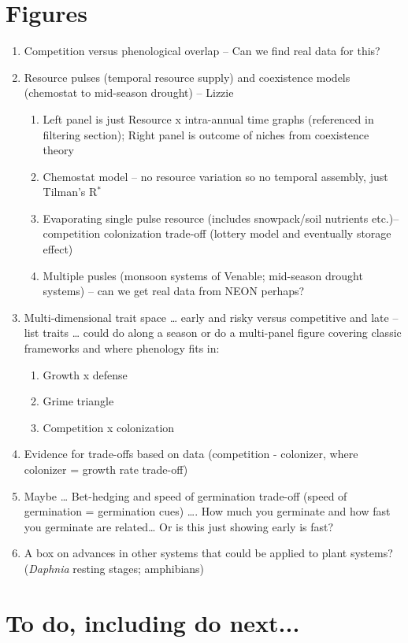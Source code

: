 \documentclass[11pt]{article}
\begin{document}
\section{Figures}
\begin{enumerate}
\item Competition versus phenological overlap -- Can we find real data for this?
\item Resource pulses (temporal resource supply) and coexistence models (chemostat to mid-season drought)  -- Lizzie
\begin{enumerate}
\item Left panel is just Resource x intra-annual time graphs (referenced in filtering section); Right panel is outcome of niches from coexistence theory 
\item Chemostat model – no resource variation so no temporal assembly, just Tilman's R$^*$
\item Evaporating single pulse resource (includes snowpack/soil nutrients etc.)– competition colonization trade-off (lottery model and eventually storage effect) 
\item Multiple pusles (monsoon systems of Venable; mid-season drought systems) -- can we get real data from NEON perhaps?
\end{enumerate}
\item Multi-dimensional trait space … early and risky versus competitive and late – list traits … could do along a season or do a multi-panel figure covering classic frameworks and where phenology fits in:
\begin{enumerate}
\item Growth x defense
\item Grime triangle
\item Competition x colonization
\end{enumerate}
\item Evidence for trade-offs based on data (competition - colonizer, where colonizer = growth rate trade-off)
\item Maybe … Bet-hedging and speed of germination trade-off (speed of germination = germination cues) …. How much you germinate and how fast you germinate are related… Or is this just showing early is fast?
\item A box on advances in other systems that could be applied to plant systems? (\emph{Daphnia} resting stages; amphibians)
\end{enumerate}

\section{To do, including do next...}
\end{document}
